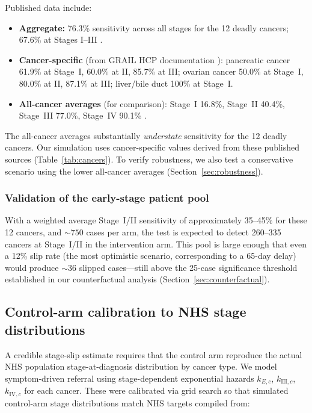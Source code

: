 \documentclass[11pt,letter]{article}
\begin{document}
Published data include:
\begin{itemize}[nosep]
\item \textbf{Aggregate:} 76.3\% sensitivity across all stages for the 12
  deadly cancers; 67.6\% at Stages I--III \cite{Klein2021}.
\item \textbf{Cancer-specific} (from GRAIL HCP documentation
  \cite{GRAILfaq}): pancreatic cancer 61.9\% at Stage~I, 60.0\% at II,
  85.7\% at III; ovarian cancer 50.0\% at Stage~I, 80.0\% at II, 87.1\% at
  III; liver/bile duct 100\% at Stage~I.
\item \textbf{All-cancer averages} (for comparison): Stage~I 16.8\%,
  Stage~II 40.4\%, Stage~III 77.0\%, Stage~IV 90.1\% \cite{Klein2021}.
\end{itemize}

\noindent The all-cancer averages substantially \emph{understate}
sensitivity for the 12 deadly cancers. Our simulation uses cancer-specific
values derived from these published sources (Table~\ref{tab:cancers}). To
verify robustness, we also test a conservative scenario using the lower
all-cancer averages (Section~\ref{sec:robustness}).

\subsubsection{Validation of the early-stage patient pool}

With a weighted average Stage~I/II sensitivity of approximately 35--45\%
for these 12 cancers, and ${\sim}750$ cases per arm, the test is expected
to detect 260--335 cancers at Stage~I/II in the intervention arm. This pool
is large enough that even a 12\% slip rate (the most optimistic scenario,
corresponding to a 65-day delay) would produce ${\sim}36$ slipped
cases---still above the 25-case significance threshold established in our
counterfactual analysis (Section~\ref{sec:counterfactual}).


\subsection{Control-arm calibration to NHS stage distributions}
\label{sec:calibration}

A credible stage-slip estimate requires that the control arm reproduce the
actual NHS population stage-at-diagnosis distribution by cancer type. We
model symptom-driven referral using stage-dependent exponential hazards
$k_{E,c}$, $k_{\text{III},c}$, $k_{\text{IV},c}$ for each cancer. These
were calibrated via grid search so that simulated control-arm stage
distributions match NHS targets compiled from:
\end{document}
